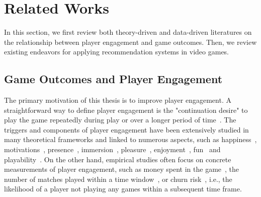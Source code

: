 \chapter{Related Works} %

\label{chapter:relatework} %

In this section, we first review both theory-driven and data-driven literatures on the relationship between player engagement and game outcomes. Then, we review existing endeavors for applying recommendation systems in video games.

\section{Game Outcomes and Player Engagement}
The primary motivation of this thesis is to improve player engagement. A straightforward way to define player engagement is the "continuation desire" to play the game repeatedly during play or over a longer period of time~\cite{schoenau2011player}. The triggers and components of player engagement have been extensively studied in many theoretical frameworks and linked to numerous aspects, such as happiness~\cite{sweetser2005gameflow,flow1990psychology,chen2007flow}, motivations~\cite{przybylski2010motivational,ryan2006motivational,yee2006demographics,yee2006motivations,sherry2006video}, presence~\cite{lombard1997heart,tamborini2006role}, immersion~\cite{mcmahan2003immersion,brown2004grounded,jennett2008measuring,ermi2005fundamental}, pleasure~\cite{costello2009tool}, enjoyment~\cite{ravaja2007fun,klimmt2003dimensions,mekler2014systematic}, fun~\cite{koster2013theory} and playability~\cite{federoff2003improving,federoff2002heuristics,desurvire2004using,nacke2009playability}. On the other hand, empirical studies often focus on concrete measurements of player engagement, such as money spent in the game~\cite{xie2015predicting,sifa2015predicting}, the number of matches played within a time window~\cite{xue2017dynamic,weber2011modeling,}, or churn risk~\cite{hadiji2014predicting,harrison2012players}, i.e., the likelihood of a player not playing any games within a subsequent time frame.

